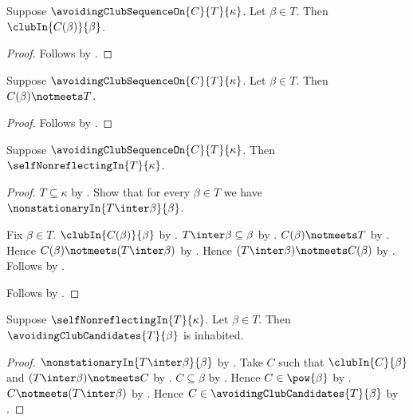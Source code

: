 \begin{proposition}\label{avoiding_club_sequence_on_club}
    Suppose $\avoidingClubSequenceOn{C}{T}{\kappa}$.
    Let $\beta\in T$.
    Then $\clubIn{C(\beta)}{\beta}$.
\end{proposition}
\begin{proof}
    Follows by .
\end{proof}

\begin{proposition}\label{avoiding_club_sequence_on_avoids}
    Suppose $\avoidingClubSequenceOn{C}{T}{\kappa}$.
    Let $\beta\in T$.
    Then $C(\beta)\notmeets T$.
\end{proposition}
\begin{proof}
    Follows by .
\end{proof}

\begin{proposition}\label{avoiding_club_sequence_on_implies_self_nonreflecting}
    Suppose $\avoidingClubSequenceOn{C}{T}{\kappa}$.
    Then $\selfNonreflectingIn{T}{\kappa}$.
\end{proposition}
\begin{proof}
    $T\subseteq\kappa$ by .
    Show that for every $\beta\in T$ we have
        $\nonstationaryIn{T\inter\beta}{\beta}$.
    \begin{subproof}
        Fix $\beta\in T$.
        $\clubIn{C(\beta)}{\beta}$
            by .
        $T\inter\beta\subseteq\beta$ by .
        $C(\beta)\notmeets T$
            by .
        Hence $C(\beta)\notmeets(T\inter\beta)$
            by .
        Hence $(T\inter\beta)\notmeets C(\beta)$ by .
        Follows by .
    \end{subproof}
    Follows by .
\end{proof}

\begin{proposition}\label{avoiding_club_candidates_inhabited}
    Suppose $\selfNonreflectingIn{T}{\kappa}$.
    Let $\beta\in T$.
    Then $\avoidingClubCandidates{T}{\beta}$ is inhabited.
\end{proposition}
\begin{proof}
    $\nonstationaryIn{T\inter\beta}{\beta}$
        by .
    Take $C$ such that $\clubIn{C}{\beta}$ and
        $(T\inter\beta)\notmeets C$ by .
    $C\subseteq\beta$ by .
    Hence $C\in\pow{\beta}$ by .
    $C\notmeets(T\inter\beta)$ by .
    Hence $C\in\avoidingClubCandidates{T}{\beta}$
        by .
\end{proof}

